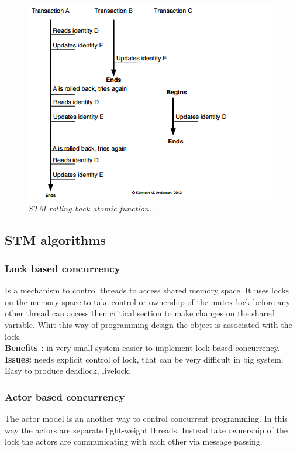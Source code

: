 \documentclass[12pt]{article}
\begin{document}
\begin{figure}[h!]
\centering
\includegraphics[scale=0.8]{Pictures/STMRollback.png}
\caption{\textit{\color{gray}STM rolling back atomic function. \cite{Kenneth}.}}
\end{figure}

\subsection{STM algorithms}
\subsubsection{Lock based concurrency}
Is a mechanism to control threads to access shared memory space. It uses locks on the memory space to take control or ownership of the mutex lock before any other thread can access then critical section to make changes on the shared variable. Whit this way of programming design the object is associated with the lock.\cite{Volkmann}\\

{\setlength{\parindent}{0cm}
\textbf{Benefits :} in very small system easier to implement lock based concurrency.\\

\textbf{Issues:} needs explicit control of lock, that can be very difficult in big system. Easy to produce deadlock, livelock.}\\
\subsubsection{Actor based concurrency}
The actor model is an another way to control concurrent programming. In this way the actors are  separate light-weight threads. Instead take ownership of the lock the actors are communicating with each other via message passing.\citep{Volkmann}
\end{document}

